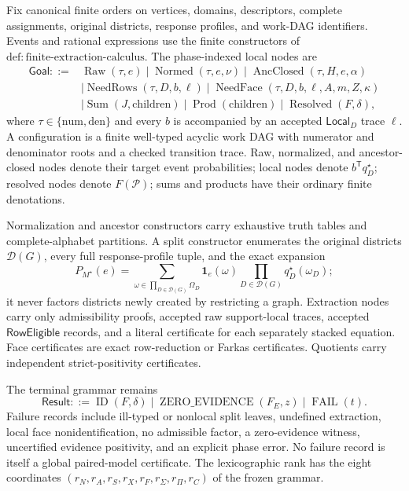 Fix canonical finite orders on vertices, domains, descriptors, complete assignments, original districts, response profiles, and work-DAG identifiers.  Events and rational expressions use the finite constructors of \(\mathrm{def:finite\text{-}extraction\text{-}calculus}\).  The phase-indexed local nodes are
\[
\begin{split}
\mathsf{Goal}::={}&\operatorname{Raw}(\tau,e)
\mid\operatorname{Normed}(\tau,e,\nu)
\mid\operatorname{AncClosed}(\tau,H,e,\alpha)\\
&\mid\operatorname{NeedRows}(\tau,D,b,\ell)
\mid\operatorname{NeedFace}(\tau,D,b,\ell,A,m,Z,\kappa)\\
&\mid\operatorname{Sum}(J,\mathrm{children})
\mid\operatorname{Prod}(\mathrm{children})
\mid\operatorname{Resolved}(F,\delta),
\end{split}
\]
where \(\tau\in\{\mathrm{num},\mathrm{den}\}\) and every \(b\) is accompanied by an accepted \(\mathsf{Local}_D\) trace \(\ell\).  A configuration is a finite well-typed acyclic work DAG with numerator and denominator roots and a checked transition trace.  Raw, normalized, and ancestor-closed nodes denote their target event probabilities; local nodes denote \(b^{\mathsf T}q_D^\star\); resolved nodes denote \(F(\mathcal P)\); sums and products have their ordinary finite denotations.

Normalization and ancestor constructors carry exhaustive truth tables and complete-alphabet partitions.  A split constructor enumerates the original districts \(\mathcal D(G)\), every full response-profile tuple, and the exact expansion
\[
P_{M^\star}(e)=\sum_{\omega\in\prod_{D\in\mathcal D(G)}\Omega_D}
\mathbf1_e(\omega)\prod_{D\in\mathcal D(G)}q_D^\star(\omega_D);
\]
it never factors districts newly created by restricting a graph.  Extraction nodes carry only admissibility proofs, accepted raw support-local traces, accepted \(\mathsf{RowEligible}\) records, and a literal certificate for each separately stacked equation.  Face certificates are exact row-reduction or Farkas certificates.  Quotients carry independent strict-positivity certificates.

The terminal grammar remains
\[
\mathsf{Result}::=\operatorname{ID}(F,\delta)\mid
\operatorname{ZERO\_EVIDENCE}(F_E,z)\mid\operatorname{FAIL}(t).
\]
Failure records include ill-typed or nonlocal split leaves, undefined extraction, local face nonidentification, no admissible factor, a zero-evidence witness, uncertified evidence positivity, and an explicit phase error.  No failure record is itself a global paired-model certificate.  The lexicographic rank has the eight coordinates \((r_N,r_A,r_S,r_X,r_F,r_\Sigma,r_\Pi,r_C)\) of the frozen grammar.